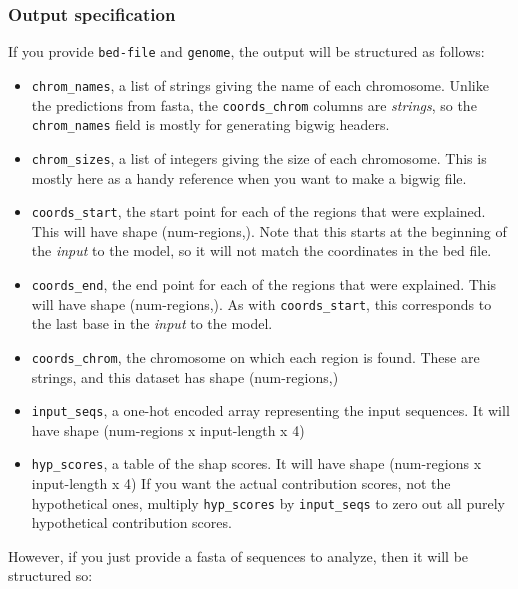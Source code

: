 \documentclass{article}
\begin{document}
\subsubsection{Output specification}

If you provide \texttt{bed-file} and \texttt{genome}, the output will be structured as follows:

\begin{itemize}
        \item \texttt{chrom\_names}, a list of strings giving the name of each chromosome.
            Unlike the predictions from fasta, the \texttt{coords\_chrom} columns are
            \emph{strings}, so the \texttt{chrom\_names} field is mostly for generating bigwig
            headers.
        \item \texttt{chrom\_sizes}, a list of integers giving the size of each chromosome.
            This is mostly here as a handy reference when you want to make a bigwig file.
        \item \texttt{coords\_start}, the start point for each of the regions that were explained.
            This will have shape (num-regions,). Note that this starts at the beginning of the
            \emph{input} to the model, so it will not match the coordinates in the bed file.
        \item \texttt{coords\_end}, the end point for each of the regions that were explained.
            This will have shape (num-regions,).
            As with \texttt{coords\_start}, this corresponds to the last base in the
            \emph{input} to the model.
        \item \texttt{coords\_chrom}, the chromosome on which each region is found.
            These are strings, and this dataset has shape (num-regions,)
        \item \texttt{input\_seqs}, a one-hot encoded array representing the input sequences.
            It will have shape (num-regions x input-length x 4)
        \item \texttt{hyp\_scores}, a table of the shap scores. It will have shape
            (num-regions x input-length x 4) If you want the actual contribution scores, not the
            hypothetical ones, multiply \texttt{hyp\_scores} by \texttt{input\_seqs} to zero out
            all purely hypothetical contribution scores.

\end{itemize}

However, if you just provide a fasta of sequences to analyze, then it will be structured so:
\end{document}
